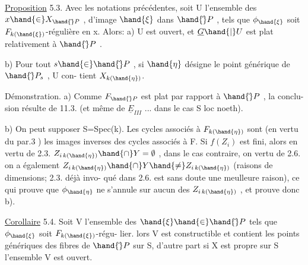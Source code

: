 
\uline{Proposition} 5.3.   Avec les notations précédentes, soit U l'ensemble des
$x\hand{\in} X_{\hand{\check{}}P}$ , d'image $\hand{\xi}$ dans $\hand{\check{}}P$ , tels que $\phi_{\hand{\xi}}$ soit $F_{k(\hand{\xi})}$-régulière en x.  Alors:
a)  U est ouvert, et $\underline{G}\hand{|}U$ est plat relativement à $\hand{\check{}}P$ .

b) Pour tout $s\hand{\in}\hand{\check{}}P$ , si $\hand{\eta}$ désigne le point générique de $\hand{\check{}}P_s$ , U con-%
tient $X_{k(\hand{\eta})}$.

Démonstration. a) Comme $F_{\hand{\check{}}P}$ est  plat par rapport à $\hand{\check{}}P$ , la conclu-%
sion résulte de 11.3. (et même de $\underline{E}_{III}$ ... dans le cas S loc noeth).

b) On peut supposer S=Spec(k). Les cycles associés à $F_{k(\hand{\eta})}$ sont
(en vertu du par.3 ) les images inverses des cycles  associés à F.  Si $f(Z_i)$ est fini, alors en vertu de 2.3. 
$Z_{i\,k(\hand{\eta})}\hand{\cap} Y = \emptyset$ , dans le cas contraire, on vertu de 2.6. on a
également $Z_{i\,k(\hand{\eta})}\hand{\cap} Y \hand{\neq} Z_{i\,k(\hand{\eta})}$ (raisons de dimensions; 2.3. déjà invo-%
qué dans 2.6. est sans doute une meulleure raison), ce qui prouve que $\phi_{\hand{\eta}}$
ne s'annule sur aucun des $Z_{i\,k(\hand{\eta})}$ , et prouve donc b).

\uline{Corollaire} 5.4. Soit V l'ensemble des $\hand{\xi}\hand{\in}\hand{\check{}}P$ tels que $\phi_{\hand{\xi}}$ soit  $F_{k(\hand{\xi})}$-régu-%
lier.  lors V est constructible et contient les points génériques des
fibres de $\hand{\check{}}P$ sur S, d'autre part si  X est propre sur S\hand{,} l'ensemble V est
ouvert. 

